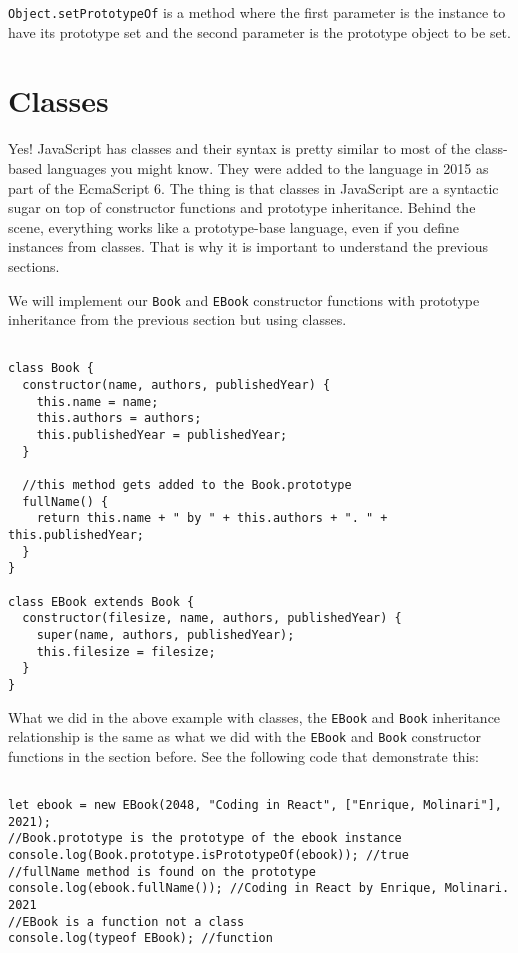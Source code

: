 \documentclass[a4paper, oneside, titlepage, 12pt]{book}
\begin{document}
\texttt{Object.setPrototypeOf} is a method where the first parameter is the instance to have its prototype set and the second parameter is the prototype object to be set.

\section{Classes}

Yes! JavaScript has classes and their syntax is pretty similar to most of the class-based languages you might know. They were added to the language in 2015 as part of the EcmaScript 6. The thing is that classes in JavaScript are a syntactic sugar on top of constructor functions and prototype inheritance. Behind the scene, everything works like a prototype-base language, even if you define instances from classes. That is why it is important to understand the previous sections.

We will implement our \texttt{Book} and \texttt{EBook} constructor functions with prototype inheritance from the previous section but using classes.

\begin{verbatim}

class Book {
  constructor(name, authors, publishedYear) {
    this.name = name;
    this.authors = authors;
    this.publishedYear = publishedYear;
  }

  //this method gets added to the Book.prototype
  fullName() {
    return this.name + " by " + this.authors + ". " + this.publishedYear;
  }
}

class EBook extends Book {
  constructor(filesize, name, authors, publishedYear) {
    super(name, authors, publishedYear);
    this.filesize = filesize;
  }
}
\end{verbatim}

What we did in the above example with classes, the \texttt{EBook} and \texttt{Book} inheritance relationship is the same as what we did with the \texttt{EBook} and \texttt{Book} constructor functions in the section before. See the following code that demonstrate this:

\begin{verbatim}

let ebook = new EBook(2048, "Coding in React", ["Enrique, Molinari"], 2021);
//Book.prototype is the prototype of the ebook instance
console.log(Book.prototype.isPrototypeOf(ebook)); //true
//fullName method is found on the prototype
console.log(ebook.fullName()); //Coding in React by Enrique, Molinari. 2021
//EBook is a function not a class
console.log(typeof EBook); //function
\end{verbatim}
\end{document}
